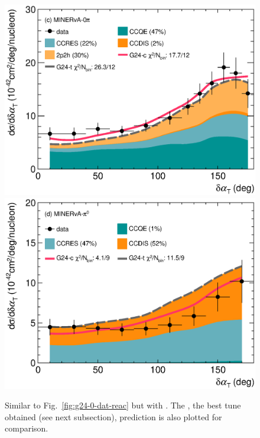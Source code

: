 \begin{figure}
        \includegraphics[width=\dbfigwid\textwidth]{figures/tuning/0013-min_0pi_dalphat_reac_decomp.eps}
        \includegraphics[width=\dbfigwid\textwidth]{figures/tuning/0013-min_pi0_dalphat_reac_decomp.eps}
        \caption{\label{fig:g24-t-dat-reac} 
        Similar to Fig.~\ref{fig:g24-0-dat-reac} but with \gT. The \gC, the best tune obtained (see next subsection), prediction is also plotted for comparison. 
        } 


\end{figure}

